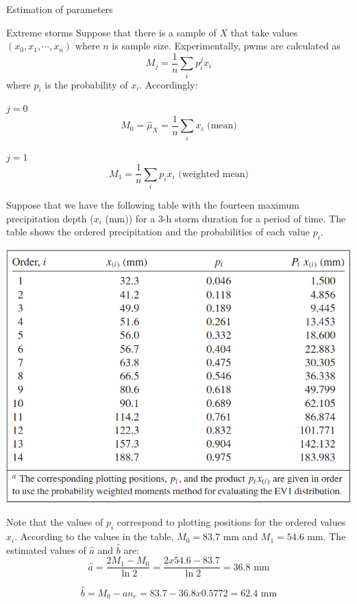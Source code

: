 \documentclass[8pt]{beamer}
\renewcommand{\emph}[1]{\textcolor{myorange}{#1}}
\begin{document}
\begin{frame}{Estimation of parameters}
\vspace{-6pt}
    \begin{exampleblock}{Extreme storms}
Suppose that there is a sample of $X$ that take values $(x_0,x_1, \cdots, x_n )$ where $n$ is sample size. Experimentally, \emph{pwms} are calculated as
\[
    M_j = \frac{1}{n} \sum_i p_i^j x_i
\]
where $p_i$ is the probability of $x_i$. Accordingly:

\begin{minipage}[t]{0.48\textwidth}
\centering
\textbf{$j=0$}
\[
    M_0 = \hat{\mu}_X =  \frac{1}{n} \sum_i x_i \text{  (mean)}
\]
\end{minipage}
\hfill
\begin{minipage}[t]{0.48\textwidth}
\centering
\textbf{$j=1$}
\[
    M_1 = \frac{1}{n} \sum_i p_i x_i \text{  (weighted mean)}
\]
\end{minipage}

Suppose that we have the following table with the fourteen maximum precipitation depth ($x_i$ (mm)) for a 3-h storm duration for a period of time. The table shows the ordered precipitation and the probabilities of each value $p_i$. 

\begin{minipage}{0.50\textwidth}
\centering
    \includegraphics[width=\textwidth]{ta321.png}
\end{minipage}
 \hfill
\begin{minipage}{0.48\textwidth}
    Note that the values of $p_i$ correspond to \emph{plotting positions} for the ordered values $x_i$. According to the values in the table, $M_0 = 83.7$ mm and $M_1 = 54.6$ mm. The estimated values of $\hat{a}$ and $\hat{b}$ are:
    \[
        \hat{a} = \frac{2 M_1 - M_0}{\ln 2} = \frac{2 x 54.6 - 83.7}{\ln 2} = 36.8 \text{ mm} 
    \]

    \[
        \hat{b} = M_0 - a n_e = 83.7 - 36.8 x 0.5772 = 62.4 \text{ mm}
    \]

\end{minipage}

    \end{exampleblock}
\end{frame}
\end{document}
